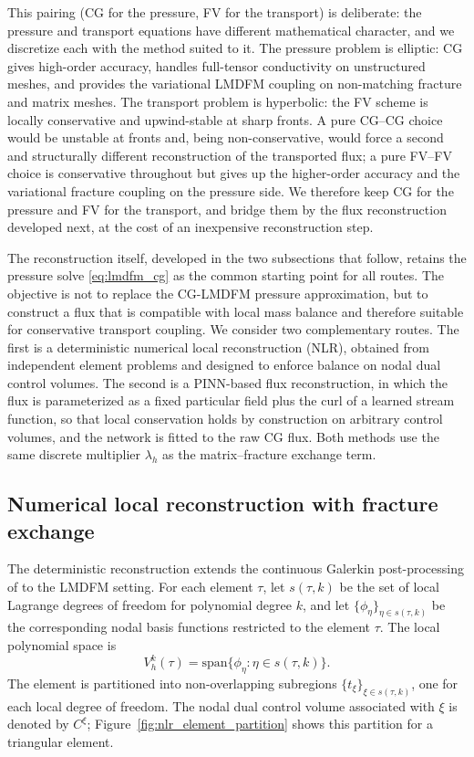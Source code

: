 \documentclass[a4paper,fleqn]{cas-sc}
\begin{document}
This pairing (CG for the pressure, FV for the transport) is deliberate: the
pressure and transport equations have different mathematical character, and we
discretize each with the method suited to it. The pressure problem is elliptic:
CG gives high-order accuracy, handles full-tensor conductivity on unstructured
meshes, and provides the variational LMDFM coupling on non-matching fracture and
matrix meshes. The transport problem is hyperbolic: the FV scheme is locally
conservative and upwind-stable at sharp fronts. A pure CG--CG choice would be
unstable at fronts and, being non-conservative, would force a second and
structurally different reconstruction of the transported flux; a pure FV--FV
choice is conservative throughout but gives up the higher-order accuracy and the
variational fracture coupling on the pressure side. We therefore keep CG for the
pressure and FV for the transport, and bridge them by the flux reconstruction
developed next, at the cost of an inexpensive reconstruction step.

The reconstruction itself, developed in the two subsections that follow, retains
the pressure solve \eqref{eq:lmdfm_cg} as the common starting point for all
routes. The objective is not to replace the CG-LMDFM
pressure approximation, but to construct a flux that is compatible with local
mass balance and therefore suitable for conservative transport coupling. We
consider two complementary routes. The first is a deterministic numerical local
reconstruction (NLR), obtained from independent element problems and designed to
enforce balance on nodal dual control volumes. The second is a
PINN-based flux reconstruction, in which the flux is parameterized as a
fixed particular field plus the curl of a learned stream function, so that
local conservation holds by construction on arbitrary control volumes, and
the network is fitted to the raw CG flux. Both methods use the same discrete
multiplier \(\lambda_h\) as the matrix--fracture exchange term.

\subsection{Numerical local reconstruction with fracture exchange}
\label{subsec:nlr}

The deterministic reconstruction extends the continuous Galerkin
post-processing of \citet{DENG2019166} to the LMDFM setting. For each element
\(\tau\), let \(s(\tau,k)\) be the set of local Lagrange degrees of freedom for
polynomial degree \(k\), and let \(\{\phi_\eta\}_{\eta\in s(\tau,k)}\) be the
corresponding nodal basis functions restricted to the element \(\tau\). The
local polynomial space is
\[
  V_h^k(\tau)=\mathrm{span}\{\phi_\eta:\eta\in s(\tau,k)\}.
\]
The element is partitioned into non-overlapping subregions
\(\{t_\xi\}_{\xi\in s(\tau,k)}\), one for each local degree of freedom. The
nodal dual control volume associated with \(\xi\) is denoted by \(C^\xi\);
Figure~\ref{fig:nlr_element_partition} shows this partition for a triangular
element.
\end{document}
